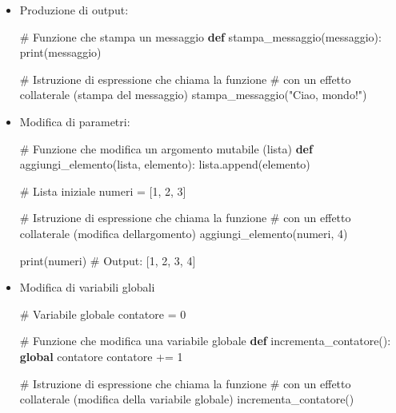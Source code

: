 \documentclass[
  letterpaper,
]{scrbook}
\newenvironment{Shaded}{\begin{snugshade}}{\end{snugshade}}
\newcommand{\BuiltInTok}[1]{\textcolor[rgb]{0.00,0.23,0.31}{#1}}
\newcommand{\CommentTok}[1]{\textcolor[rgb]{0.37,0.37,0.37}{#1}}
\newcommand{\DecValTok}[1]{\textcolor[rgb]{0.68,0.00,0.00}{#1}}
\newcommand{\KeywordTok}[1]{\textcolor[rgb]{0.00,0.23,0.31}{\textbf{#1}}}
\newcommand{\NormalTok}[1]{\textcolor[rgb]{0.00,0.23,0.31}{#1}}
\newcommand{\OperatorTok}[1]{\textcolor[rgb]{0.37,0.37,0.37}{#1}}
\newcommand{\StringTok}[1]{\textcolor[rgb]{0.13,0.47,0.30}{#1}}
\begin{document}
\begin{itemize}
\item
  Produzione di output:

\begin{Shaded}
\begin{Highlighting}[]
\CommentTok{\# Funzione che stampa un messaggio}
\KeywordTok{def}\NormalTok{ stampa\_messaggio(messaggio):}
    \BuiltInTok{print}\NormalTok{(messaggio)}

\CommentTok{\# Istruzione di espressione che chiama la funzione }
\CommentTok{\# con un effetto collaterale (stampa del messaggio)}
\NormalTok{stampa\_messaggio(}\StringTok{"Ciao, mondo!"}\NormalTok{)}
\end{Highlighting}
\end{Shaded}
\item
  Modifica di parametri:

\begin{Shaded}
\begin{Highlighting}[]
\CommentTok{\# Funzione che modifica un argomento mutabile (lista)}
\KeywordTok{def}\NormalTok{ aggiungi\_elemento(lista, elemento):}
\NormalTok{    lista.append(elemento)}

\CommentTok{\# Lista iniziale}
\NormalTok{numeri }\OperatorTok{=}\NormalTok{ [}\DecValTok{1}\NormalTok{, }\DecValTok{2}\NormalTok{, }\DecValTok{3}\NormalTok{]}

\CommentTok{\# Istruzione di espressione che chiama la funzione }
\CommentTok{\# con un effetto collaterale (modifica dell\textquotesingle{}argomento)}
\NormalTok{aggiungi\_elemento(numeri, }\DecValTok{4}\NormalTok{)}

\BuiltInTok{print}\NormalTok{(numeri)  }\CommentTok{\# Output: [1, 2, 3, 4]}
\end{Highlighting}
\end{Shaded}
\item
  Modifica di variabili globali

\begin{Shaded}
\begin{Highlighting}[]
\CommentTok{\# Variabile globale}
\NormalTok{contatore }\OperatorTok{=} \DecValTok{0}

\CommentTok{\# Funzione che modifica una variabile globale}
\KeywordTok{def}\NormalTok{ incrementa\_contatore():}
    \KeywordTok{global}\NormalTok{ contatore}
\NormalTok{    contatore }\OperatorTok{+=} \DecValTok{1}

\CommentTok{\# Istruzione di espressione che chiama la funzione }
\CommentTok{\# con un effetto collaterale (modifica della variabile globale)}
\NormalTok{incrementa\_contatore()}


\end{Highlighting}
\end{Shaded}
\end{itemize}
\end{document}
